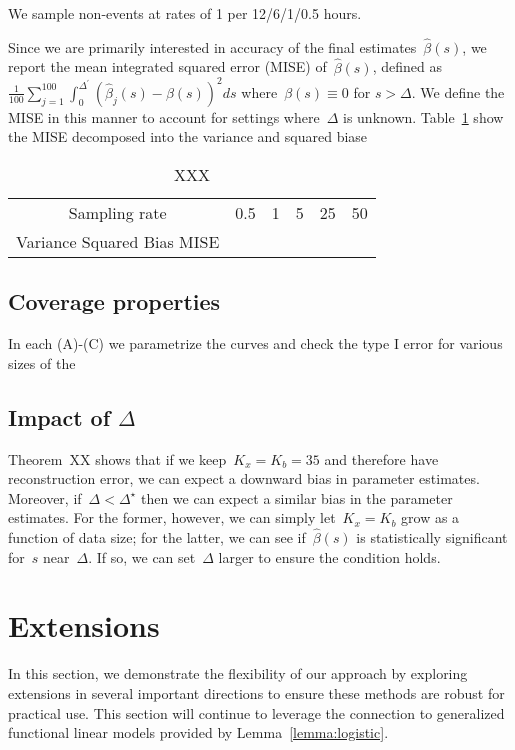 \documentclass[11pt]{amsart}
\begin{document}
We sample non-events at rates of 1 per 12/6/1/0.5 hours.

Since we are primarily interested in accuracy of the final estimates~$\hat \beta(s)$, we report the mean integrated squared error (MISE) of~$\hat \beta (s)$, defined as~$\frac{1}{100} \sum_{j=1}^{100} \int_{0}^{\Delta^\prime} ( \hat \beta_j (s) - \beta(s))^2 ds$ where~$\beta(s) \equiv 0$ for $s > \Delta$.  We define the MISE in this manner to account for settings where~$\Delta$ is unknown. Table~\ref{tab:mise} show the MISE decomposed into the variance and squared biase

\begin{table}[!th]
\begin{tabular}{c | c c c c c}
Sampling rate & 0.5 & 1 & 5 & 25 & 50 \\
Variance
Squared Bias
MISE
\end{tabular}
\caption{XXX}
\label{tab:mise}
\end{table}

\subsection{Coverage properties}

In each (A)-(C) we parametrize the curves and check the type I error
for various sizes of the

\subsection{Impact of $\Delta$}

Theorem~XX shows that if we keep~$K_x = K_b = 35$ and therefore have reconstruction error, we can expect a downward bias in parameter estimates. Moreover, if~$\Delta < \Delta^\star$ then we can expect a similar bias in the parameter estimates.  For the former, however, we can simply let~$K_x = K_b$ grow as a function of data size; for the latter, we can see if~$\hat \beta(s)$ is statistically significant for~$s$ near~$\Delta$. If so, we can set~$\Delta$ larger to ensure the condition holds.

\section{Extensions}

In this section, we demonstrate the flexibility of our approach by exploring extensions in several important directions to ensure these methods are robust for practical use. This section will continue to leverage the connection to generalized functional linear models provided by Lemma~\ref{lemma:logistic}.
\end{document}
